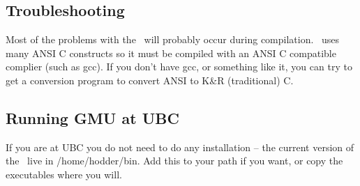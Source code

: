 \documentclass[11pt,twoside]{article}
\begin{document}
\subsection*{Troubleshooting}

Most of the problems with the \gmu\ will probably occur during compilation.
\gmu\ uses many ANSI C constructs so it must be compiled with an ANSI C 
compatible complier (such as gcc). If you don't have gcc, or  something 
like it, you can try to get a conversion  program to convert ANSI to K\&R 
(traditional) C.

\subsection*{Running GMU at UBC}

If you are at UBC you do not need to do any installation -- the current
version of the \gmu\ live in /home/hodder/bin. Add this to your path if you
want, or copy the executables where you will. 
\end{document}
